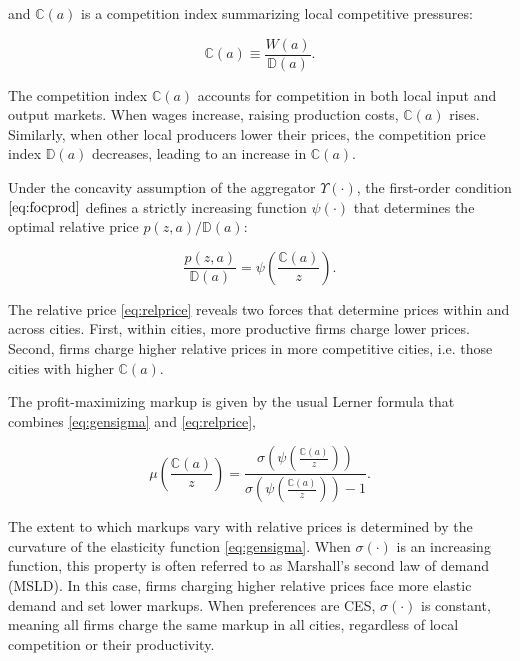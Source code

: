 and $\mathbb{C}(a)$ is a competition index summarizing local competitive pressures:  

\begin{equation}\label{eq:competitionind}
	\mathbb{C}(a) \equiv  \frac{W(a)}{\mathbb{D}(a)}.
\end{equation}  

The competition index $\mathbb{C}(a)$ accounts for competition in both local input and output markets. When wages increase, raising production costs, $\mathbb{C}(a)$ rises. Similarly, when other local producers lower their prices, the competition price index $\mathbb{D}(a)$ decreases, leading to an increase in $\mathbb{C}(a)$.  

Under the concavity assumption of the aggregator $\Upsilon(\cdot)$, the first-order condition $\eqref{eq:focprod}$ defines a strictly increasing function $\psi(\cdot)$ that determines the optimal relative price $p(z,a)/\mathbb{D}(a)$:

\begin{equation}\label{eq:relprice}
	\frac{p(z,a)}{\mathbb{D}(a)} = \psi\left(\frac{\mathbb{C}(a)}{z}\right).
\end{equation}

The relative price \eqref{eq:relprice} reveals two forces that determine prices within and across cities. First, within cities, more productive firms charge lower prices. Second, firms charge higher relative prices in more competitive cities, i.e. those cities with higher $\mathbb{C}(a)$. 

The profit-maximizing markup is given by the usual Lerner formula that combines \eqref{eq:gensigma} and \eqref{eq:relprice},

\begin{equation}\label{eq:optm}
	\mu\left(\frac{\mathbb{C}(a)}{z}\right) = \frac{\sigma\left(\psi\left(\frac{\mathbb{C}(a)}{z}\right)\right)}{\sigma\left(\psi\left(\frac{\mathbb{C}(a)}{z}\right)\right) - 1}.
\end{equation}

The extent to which markups vary with relative prices is determined by the curvature of the elasticity function \eqref{eq:gensigma}. When $\sigma(\cdot)$ is an increasing function, this property is often referred to as Marshall's second law of demand (MSLD). In this case, firms charging higher relative prices face more elastic demand and set lower markups. When preferences are CES, $\sigma(\cdot)$ is constant, meaning all firms charge the same markup in all cities, regardless of local competition or their productivity.

